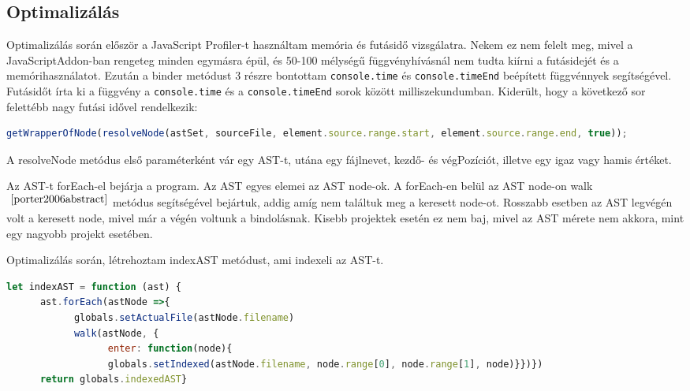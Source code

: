 \subsection{Optimalizálás}

\noindent

Optimalizálás során először a JavaScript Profiler-t használtam memória és futásidő vizsgálatra.
Nekem ez nem felelt meg, mivel a JavaScriptAddon-ban rengeteg minden egymásra épül, és 50-100 mélységű függvényhívásnál nem tudta kiírni a futásidejét és a memórihasználatot.
Ezután a binder metódust 3 részre bontottam \texttt{console.time} és \texttt{console.timeEnd} beépített függvénnyek segítségével.
Futásidőt írta ki a függvény a \texttt{console.time} és a \texttt{console.timeEnd} sorok között milliszekundumban.
Kiderült, hogy a következő sor felettébb nagy futási idővel rendelkezik:

\begin{lstlisting}[caption={Lassú metódus}, label={lst:binder_problemas_function}, language={JavaScript}]
getWrapperOfNode(resolveNode(astSet, sourceFile, element.source.range.start, element.source.range.end, true));
\end{lstlisting}

A resolveNode metódus első paraméterként vár egy AST-t, utána egy fájlnevet, kezdő- és végPozíciót, illetve egy igaz vagy hamis értéket.

Az AST-t forEach-el bejárja a program. Az AST egyes elemei az AST node-ok.
A forEach-en belül az AST node-on walk$^{~\cite{porter2006abstract}}$  metódus segítségével bejártuk, addig amíg nem találtuk meg a keresett node-ot.
Rosszabb esetben az AST legvégén volt a keresett node, mivel már a végén voltunk a bindolásnak.
Kisebb projektek esetén ez nem baj, mivel az AST mérete nem akkora, mint egy nagyobb projekt esetében.

\noindent

Optimalizálás során, létrehoztam indexAST metódust, ami indexeli az AST-t.

\begin{lstlisting}[caption={indexAST metódus}, label={lst:indexAST_function}, language={JavaScript}]
let indexAST = function (ast) {
      ast.forEach(astNode =>{
            globals.setActualFile(astNode.filename)
            walk(astNode, {
                  enter: function(node){
                  globals.setIndexed(astNode.filename, node.range[0], node.range[1], node)}})})
      return globals.indexedAST}
\end{lstlisting}

